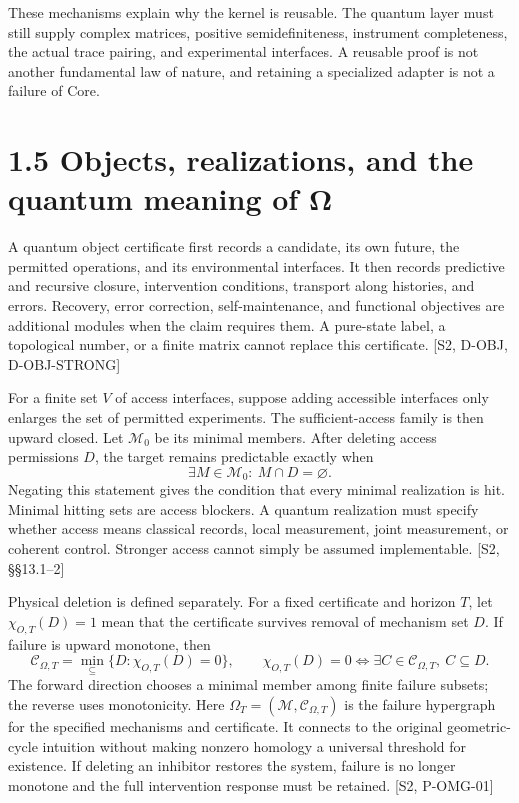 \documentclass[
  11pt,
  oneside]{book}
\begin{document}
These mechanisms explain why the kernel is reusable. The quantum layer
must still supply complex matrices, positive semidefiniteness,
instrument completeness, the actual trace pairing, and experimental
interfaces. A reusable proof is not another fundamental law of nature,
and retaining a specialized adapter is not a failure of Core.

\section{1.5 Objects, realizations, and the quantum meaning of Ω}

A quantum object certificate first records a candidate, its own future,
the permitted operations, and its environmental interfaces. It then
records predictive and recursive closure, intervention conditions,
transport along histories, and errors. Recovery, error correction,
self-maintenance, and functional objectives are additional modules when
the claim requires them. A pure-state label, a topological number, or a
finite matrix cannot replace this certificate. {[}S2, D-OBJ,
D-OBJ-STRONG{]}

For a finite set \(V\) of access interfaces, suppose adding accessible
interfaces only enlarges the set of permitted experiments. The
sufficient-access family is then upward closed. Let \(\mathcal M_0\) be
its minimal members. After deleting access permissions \(D\), the target
remains predictable exactly when \[
\exists M\in\mathcal M_0:\ M\cap D=\varnothing.
\] Negating this statement gives the condition that every minimal
realization is hit. Minimal hitting sets are access blockers. A quantum
realization must specify whether access means classical records, local
measurement, joint measurement, or coherent control. Stronger access
cannot simply be assumed implementable. {[}S2, §§13.1--2{]}

Physical deletion is defined separately. For a fixed certificate and
horizon \(T\), let \(\chi_{O,T}(D)=1\) mean that the certificate
survives removal of mechanism set \(D\). If failure is upward monotone,
then \[
\mathcal C_{\Omega,T}=\min_{\subseteq}\{D:\chi_{O,T}(D)=0\},\qquad
\chi_{O,T}(D)=0\iff\exists C\in\mathcal C_{\Omega,T},\ C\subseteq D.
\] The forward direction chooses a minimal member among finite failure
subsets; the reverse uses monotonicity. Here
\(\Omega_T=(\mathcal M,\mathcal C_{\Omega,T})\) is the failure
hypergraph for the specified mechanisms and certificate. It connects to
the original geometric-cycle intuition without making nonzero homology a
universal threshold for existence. If deleting an inhibitor restores the
system, failure is no longer monotone and the full intervention response
must be retained. {[}S2, P-OMG-01{]}
\end{document}
